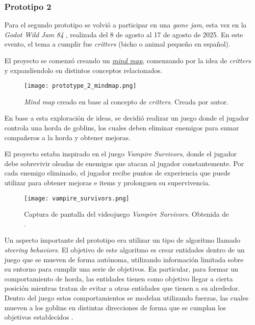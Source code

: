 \subsubsection{Prototipo 2}
\par Para el segundo prototipo se volvió a participar en una \textit{game jam}, esta vez en la \textit{Godot Wild Jam 84} \cite{GodotWildJam}, realizada del 8 de agosto al 17 de agosto de 2025. En este evento, el tema a cumplir fue \textit{critters} (bicho o animal pequeño en español).
\par El proyecto se comenzó creando un  \textit{\hyperref[sec:ideation_lemarchand]{mind map}}, comenzando por la idea de \textit{critters} y expandiendolo en distintos conceptos relacionados.
%
\begin{figure}[H]
  \centering
  \texttt{[image: prototype\_2\_mindmap.png]}
  \caption{\textit{Mind map} creado en base al concepto de \textit{critters}. Creada por autor.}
  \label{fig:x mindmap prototipo 2} 
\end{figure}
\par En base a esta exploración de ideas, se decidió realizar un juego donde el jugador controla una horda de goblins, los cuales deben eliminar enemigos para sumar compañeros a la horda y obtener mejoras.
\par El proyecto estaba inspirado en el juego \textit{Vampire Survivors}, donde el jugador debe sobrevivir oleadas de enemigos que atacan al jugador constantemente. Por cada enemigo eliminado, el jugador recibe puntos de experiencia que puede utilizar para obtener mejoras e items y prolonguen su supervivencia.
%
\begin{figure}[H]
  \centering
  \texttt{[image: vampire\_survivors.png]}
  \caption{Captura de pantalla del videojuego \textit{Vampire Survivors}. Obtenida de \cite{VampireSurvivorsSteam}.}
  \label{fig:x Vampire Survivors} 
\end{figure}
%
\par Un aspecto importante del prototipo era utilizar un tipo de algoritmo llamado \textit{steering behaviors}. El objetivo de este algoritmo es crear entidades dentro de un juego que se mueven de forma autónoma, utilizando información limitada sobre su entorno para cumplir una serie de objetivos. En particular, para formar un comportamiento de horda, las entidades tienen como objetivo llegar a cierta posición mientras tratan de evitar a otras entidades que tienen a su alrededor. Dentro del juego estos comportamientos se modelan utilizando fuerzas, las cuales mueven a los goblins en distintas direcciones de forma que se cumplan los objetivos establecidos \cite{5AutonomousAgentsa,SteeringBehaviorsAutonomous}.
